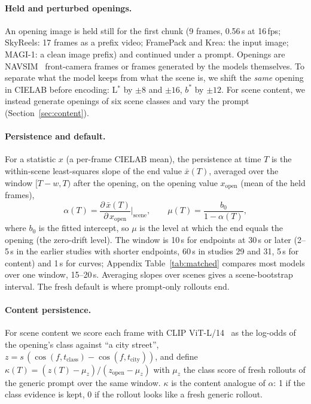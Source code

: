 \documentclass[10pt]{article}
\newcommand{\Lstar}{L$^{*}$}
\begin{document}
\paragraph{Held and perturbed openings.} An opening image is held still for the first chunk (9 frames, 0.56\,s at
16\,fps; SkyReels: 17 frames as a prefix video; FramePack and Krea: the input image; MAGI-1: a clean image prefix) and continued
under a prompt. Openings
are NAVSIM~\cite{navsim} front-camera frames or frames generated by the models themselves. To separate what the model
keeps from what the scene is, we shift the \emph{same} opening in CIELAB before encoding: \Lstar{} by $\pm8$ and
$\pm16$, $b^*$ by $\pm12$. For scene content, we instead generate openings of six scene classes and vary the prompt
(Section~\ref{sec:content}).

\paragraph{Persistence and default.} For a statistic $x$ (a per-frame CIELAB mean), the persistence at time $T$ is the
within-scene least-squares slope of the end value $\bar x(T)$, averaged over the window $[T-w, T)$ after the opening,
on the opening value $x_{\text{open}}$ (mean of the held frames),
\begin{equation}
\alpha(T) = \frac{\partial\, \bar x(T)}{\partial\, x_{\text{open}}}\Big|_{\text{scene}},
\qquad \mu(T) = \frac{b_0}{1-\alpha(T)},
\end{equation}
where $b_0$ is the fitted intercept, so $\mu$ is the level at which the end equals the opening (the zero-drift level).
The window is 10\,s for endpoints at 30\,s or later (2--5\,s in the earlier studies with shorter endpoints, 60\,s in
studies 29 and 31, 5\,s for content) and 1\,s for curves; Appendix Table~\ref{tab:matched} compares most models over one window, 15--20\,s. Averaging slopes
over scenes gives a scene-bootstrap interval. The fresh default is where prompt-only rollouts end.

\paragraph{Content persistence.} For scene content we score each frame with CLIP ViT-L/14~\cite{clip} as the log-odds
of the opening's class against ``a city street'', $z = s\,(\cos(f, t_{\text{class}}) - \cos(f, t_{\text{city}}))$, and
define $\kappa(T) = (z(T)-\mu_z)/(z_{\text{open}}-\mu_z)$ with $\mu_z$ the class score of fresh rollouts of the generic
prompt over the same window. $\kappa$ is the content analogue of $\alpha$: 1 if the class evidence is kept, 0 if the rollout looks like a
fresh generic rollout.
\end{document}
